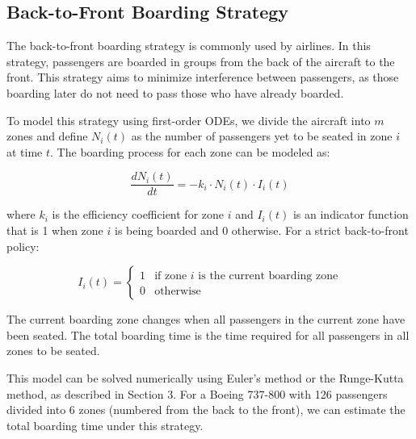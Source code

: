 \documentclass[12pt,a4paper]{article}
\begin{document}
\subsection{Back-to-Front Boarding Strategy}

The back-to-front boarding strategy is commonly used by airlines. In this strategy, passengers are boarded in groups from the back of the aircraft to the front. This strategy aims to minimize interference between passengers, as those boarding later do not need to pass those who have already boarded.

To model this strategy using first-order ODEs, we divide the aircraft into $m$ zones and define $N_i(t)$ as the number of passengers yet to be seated in zone $i$ at time $t$. The boarding process for each zone can be modeled as:

\begin{equation}
\frac{dN_i(t)}{dt} = -k_i \cdot N_i(t) \cdot I_i(t)
\label{eq:zone_boarding}
\end{equation}

where $k_i$ is the efficiency coefficient for zone $i$ and $I_i(t)$ is an indicator function that is 1 when zone $i$ is being boarded and 0 otherwise. For a strict back-to-front policy:

\begin{equation}
I_i(t) = 
\begin{cases}
1 & \text{if zone } i \text{ is the current boarding zone} \\
0 & \text{otherwise}
\end{cases}
\label{eq:indicator}
\end{equation}

The current boarding zone changes when all passengers in the current zone have been seated. The total boarding time is the time required for all passengers in all zones to be seated.

This model can be solved numerically using Euler's method or the Runge-Kutta method, as described in Section 3. For a Boeing 737-800 with 126 passengers divided into 6 zones (numbered from the back to the front), we can estimate the total boarding time under this strategy.
\end{document}
